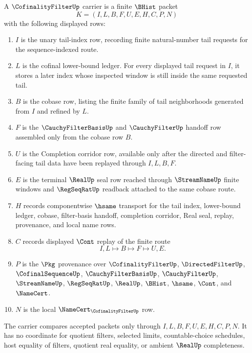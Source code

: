 \begin{definition}\label{def:cofinality-filter-carrier}
A $\CofinalityFilterUp$ carrier is a finite $\BHist$ packet
$$
K=(I,L,B,F,U,E,H,C,P,N)
$$
with the following displayed rows:
\begin{enumerate}
\item $I$ is the unary tail-index row, recording finite natural-number tail requests for the sequence-indexed route.
\item $L$ is the cofinal lower-bound ledger. For every displayed tail request in $I$, it stores a later index whose inspected window is still inside the same requested tail.
\item $B$ is the cobase row, listing the finite family of tail neighborhoods generated from $I$ and refined by $L$.
\item $F$ is the $\CauchyFilterBasisUp$ and $\CauchyFilterUp$ handoff row assembled only from the cobase row $B$.
\item $U$ is the Completion corridor row, available only after the directed and filter-facing tail data have been replayed through $I,L,B,F$.
\item $E$ is the terminal $\RealUp$ seal row reached through $\StreamNameUp$ finite windows and $\RegSeqRatUp$ readback attached to the same cobase route.
\item $H$ records componentwise $\hsame$ transport for the tail index, lower-bound ledger, cobase, filter-basis handoff, completion corridor, Real seal, replay, provenance, and local name rows.
\item $C$ records displayed $\Cont$ replay of the finite route
$$
I,L \longmapsto B \longmapsto F \longmapsto U,E .
$$
\item $P$ is the $\Pkg$ provenance over $\CofinalityFilterUp$, $\DirectedFilterUp$, $\CofinalSequenceUp$, $\CauchyFilterBasisUp$, $\CauchyFilterUp$, $\StreamNameUp$, $\RegSeqRatUp$, $\RealUp$, $\BHist$, $\hsame$, $\Cont$, and $\NameCert$.
\item $N$ is the local $\NameCert_{\CofinalityFilterUp}$ row.
\end{enumerate}
The carrier compares accepted packets only through $I,L,B,F,U,E,H,C,P,N$. It has no coordinate for quotient filters, selected limits, countable-choice schedules, host equality of filters, quotient real equality, or ambient $\RealUp$ completeness.
\end{definition}

